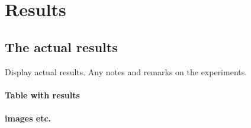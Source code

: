 \chapter{Results}

\section{The actual results}
Display actual results. Any notes and remarks on the experiments.
\\\\
\textbf{Table with results}
\\\\
\textbf{images etc.}
